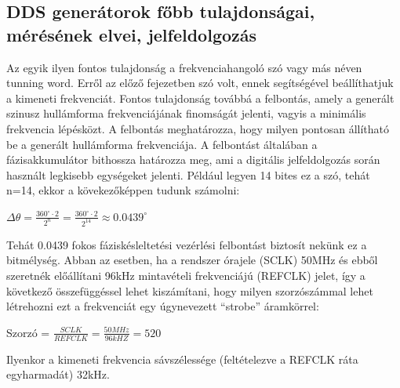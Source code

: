 \documentclass[a4paper,12pt]{article}
\begin{document}
			\subsection{DDS generátorok főbb tulajdonságai, mérésének elvei, jelfeldolgozás}
			Az egyik ilyen fontos tulajdonság a frekvenciahangoló szó vagy más néven tunning word. Erről az előző fejezetben szó volt, ennek segítségével beállíthatjuk a kimeneti frekvenciát. 
			Fontos tulajdonság továbbá a felbontás, amely a generált szinusz hullámforma frekvenciájának finomságát jelenti, vagyis a minimális frekvencia lépésközt. A felbontás meghatározza, hogy milyen pontosan állítható be a generált hullámforma frekvenciája. A felbontást általában a fázisakkumulátor bithossza határozza meg, ami a digitális jelfeldolgozás során használt legkisebb egységeket jelenti. Például legyen 14 bites ez a szó, tehát n=14, ekkor a kövekezőképpen tudunk számolni:
			\begin{center}
				$\Delta\theta = \frac{360^\circ \cdot 2}{2^n} =  \frac{360^\circ \cdot 2}{2^{14}} \approx 0.0439^\circ$
			\end{center}
			Tehát 0.0439 fokos fáziskésleltetési vezérlési felbontást biztosít nekünk ez a bitmélység.
			Abban az esetben, ha a rendszer órajele (SCLK) 50MHz és ebből szeretnék előállítani 96kHz mintavételi frekvenciájú (REFCLK) jelet, így a következő összefüggéssel lehet kiszámítani, hogy milyen szorzószámmal lehet létrehozni ezt a frekvenciát egy úgynevezett “strobe” áramkörrel:
			\begin{center}
				Szorzó = $\frac{SCLK}{REFCLK} = \frac{50MHz}{96kHZ} = 520$
			\end{center}
			Ilyenkor a kimeneti frekvencia sávszélessége (feltételezve a REFCLK ráta egyharmadát) 32kHz.
			
\end{document}
